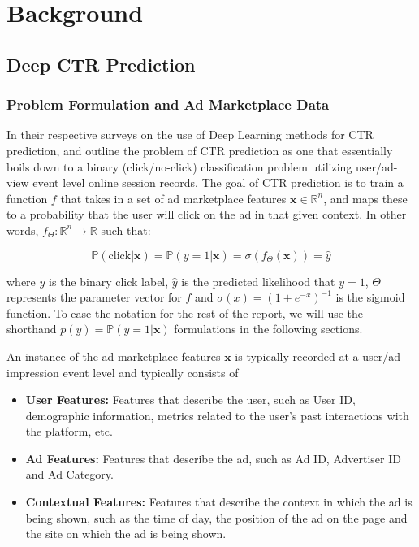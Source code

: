 \documentclass{mldsmsc}
\begin{document}
\chapter{Background}
\label{chap:background}

\section{Deep CTR Prediction}

\subsection{Problem Formulation and Ad Marketplace Data}
\label{sec:problem-formulation-data}

In their respective surveys on the use of Deep Learning methods for CTR prediction, \cite{RefWorks:gu2021ad} 
and \cite{RefWorks:zhang2021deep} outline the problem of CTR prediction as one that essentially boils down to
a binary (click/no-click) classification problem utilizing user/ad-view event level online session records. 
The goal of CTR prediction is to train a function $f$ that takes in a set of ad marketplace 
features $\mathbf{x} \in \mathbb{R}^n$, and maps these to a probability that the user 
will click on the ad in that given context. In other words, $f_{\Theta}: \mathbb{R}^n \rightarrow \mathbb{R}$ such that:

\begin{equation}
\label{eqn:ctr-classifier}
\mathbb{P}(\text{click}| \mathbf{x})
= \mathbb{P}(y = 1 | \mathbf{x})
= \sigma(f_{\Theta}(\mathbf{x}))
= \hat{y}
\end{equation}

where $y$ is the binary click label, $\hat{y}$ is the predicted likelihood that $y=1$, $\Theta$ represents the parameter vector for $f$ and
$\sigma(x)=(1 + e^{-x})^{-1}$ is the sigmoid function. To ease the notation for the rest of the report,
we will use the shorthand $p(y) = \mathbb{P}(y=1 | \mathbf{x})$ formulations in the following
sections. 

An instance of the ad marketplace features $\mathbf{x}$ is typically
recorded at a user/ad impression event level and typically consists of

\begin{itemize}
\item \textbf{User Features:} Features that describe the user, such as User ID, demographic information,
metrics related to the user's past interactions with the platform, etc.
\item \textbf{Ad Features:} Features that describe the ad, such as Ad ID, Advertiser ID and Ad Category.
\item \textbf{Contextual Features:} Features that describe the context in which the ad is being shown, such as
the time of day, the position of the ad on the page and the site on which the ad is being shown.
\end{itemize}
\end{document}
